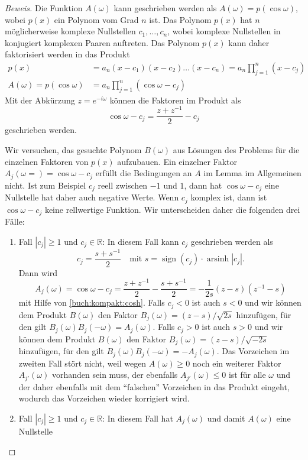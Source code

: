\begin{proof}[Beweis]
Die Funktion $A(\omega)$ kann geschrieben werden als
$A(\omega) = p(\cos\omega)$, wobei $p(x)$ ein Polynom vom
Grad $n$ ist.
Das Polynom $p(x)$ hat $n$ möglicherweise komplexe Nullstellen
$c_1,\dots,c_n$, wobei komplexe Nullstellen in konjugiert komplexen
Paaren auftreten.
Das Polynom $p(x)$ kann daher faktorisiert werden in das Produkt
\begin{align*}
p(x)
&=
a_n(x-c_1)(x-c_2)\dots(x-c_n)
=
a_n \prod_{j=1}^n (x-c_j)
\\
A(\omega) = p(\cos\omega)
&=
a_n \prod_{j=1}^n (\cos \omega - c_j)
\end{align*}
Mit der Abkürzung $z=e^{-i\omega}$ können die Faktoren im Produkt als
\[
\cos\omega -c_j = \frac{z+z^{-1}}2-c_j
\]
geschrieben werden.

Wir versuchen, das gesuchte Polynom $B(\omega)$ aus Lösungen des Problems
für die einzelnen Faktoren von $p(x)$ aufzubauen.
Ein einzelner Faktor $A_j(\omega=)=\cos\omega - c_j$ erfüllt die Bedingungen an
$A$ im Lemma im Allgemeinen nicht.
Ist zum Beispiel $c_j$ reell zwischen $-1$ und $1$, dann hat
$\cos\omega-c_j$ eine Nullstelle hat daher auch negative Werte.
Wenn $c_j$ komplex ist, dann ist $\cos\omega-c_j$ keine rellwertige
Funktion.
Wir unterscheiden daher die folgenden drei Fälle:
\begin{enumerate}
\item
Fall $|c_j|\ge 1$ und $c_j\in\mathbb R$:
In diesem Fall kann $c_j$ geschrieben werden als
\[
c_j = \frac{s+s^{-1}}2
\quad
\text{mit $s=\operatorname{sign}(c_j)\cdot \operatorname{arsinh}|c_j|$.}
\]
Dann wird
\[
A_j(\omega)
=
\cos\omega - c_j
=
\frac{z+z^{-1}}2 - \frac{s+s^{-1}}2
=
-\frac1{2s} (z-s)(z^{-1}-s)
\]
mit Hilfe von \eqref{buch:kompakt:cosh}.
Falls $c_j < 0$ ist auch $s<0$ und wir können dem Produkt $B(\omega)$
den Faktor $B_j(\omega)=(z-s)/\sqrt{2s}$ hinzufügen, für den gilt
$B_j(\omega)B_j(-\omega)=A_j(\omega)$.
Falls $c_j > 0$ ist auch $s>0$ und wir können dem Produkt $B(\omega)$
den Faktor $B_j(\omega) =(z-s)/\sqrt{-2s}$ hinzufügen, für den
gilt $B_j(\omega)B_j(-\omega)=-A_j(\omega)$.
Das Vorzeichen im zweiten Fall stört nicht, weil wegen $A(\omega)\ge 0$
noch ein weiterer Faktor $A_{j'}(\omega)$ vorhanden sein muss, der ebenfalls
$A_{j'}(\omega)\le 0$ ist für alle $\omega$ und der daher ebenfalls
mit dem ``falschen'' Vorzeichen in das Produkt eingeht, wodurch das
Vorzeichen wieder korrigiert wird.
\item
Fall $|c_j|\ge 1$ und $c_j\in\mathbb R$:
In diesem Fall hat $A_j(\omega)$ und damit $A(\omega)$ eine Nullstelle

\end{enumerate}
\end{proof}
